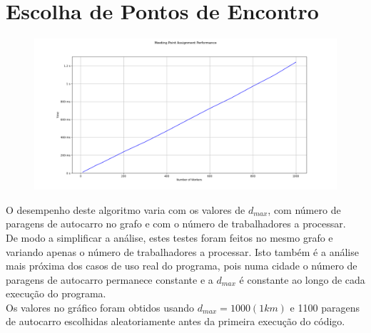 \documentclass{report}
\begin{document}
  \section{Escolha de Pontos de Encontro}
    \begin{figure}[H]
      \centering
      \includegraphics[width=1.0\textwidth]{img/meetAssign_performance.png}
    \end{figure}
    O desempenho deste algoritmo varia com os valores de $d_{max}$, com número de
    paragens de autocarro no grafo e com o número de trabalhadores a processar.\\
    De modo a simplificar a análise, estes testes foram feitos no mesmo grafo e
    variando apenas o número de trabalhadores a processar. Isto também é a análise
    mais próxima dos casos de uso real do programa, pois numa cidade o número de
    paragens de autocarro permanece constante e a $d_{max}$ é constante ao longo
    de cada execução do programa.\\
    Os valores no gráfico foram obtidos usando $d_{max} = 1000 (1km)$ e 1100 paragens
    de autocarro escolhidas aleatoriamente antes da primeira execução do código.
\end{document}
